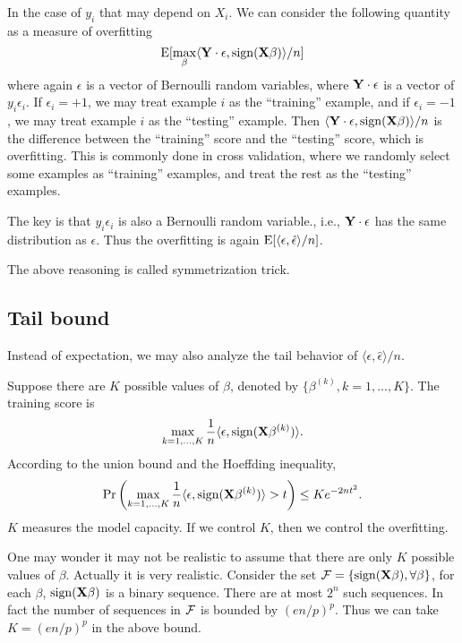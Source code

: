 \documentclass[11pt]{article}
\newcommand{\E}{\mathbb{E}}
\def\E{{\rm E}}
\def\X{{\bf X}}
\def\Y{{\bf Y}}
\begin{document}
In the case of $y_i$ that may depend on $X_i$.  We can consider the following quantity as a measure of overfitting 
\[
    \E[\max_\beta \langle \Y \cdot \epsilon, {\rm sign}(\X\beta)\rangle /n]
 \]
 where again $\epsilon$ is a vector of Bernoulli random variables, where $\Y \cdot \epsilon$ is a vector of $y_i \epsilon_i$.  If $\epsilon_i = +1$, we may treat example $i$ as the ``training'' example, and if $\epsilon_i = -1$, we may treat example $i$ as the ``testing'' example.  Then $ \langle \Y \cdot \epsilon, {\rm sign}(\X\beta)\rangle /n$ is the difference between the ``training'' score and the ``testing'' score, which is overfitting.  This is commonly done in cross validation, where we randomly select some examples as ``training'' examples, and treat the rest as the ``testing'' examples. 
 
 The key is that $y_i \epsilon_i$ is also a Bernoulli random variable., i.e., $\Y \cdot \epsilon$ has the same distribution as $\epsilon$.  Thus the overfitting is again $\E[\langle \epsilon, \hat{\epsilon}\rangle/n]$. 
 
 The above reasoning is called symmetrization trick. 

 
 \subsection{Tail bound} 
 
Instead of expectation, we may also analyze the tail behavior of   $\langle \epsilon, \hat{\epsilon}\rangle/n$. 


Suppose there are $K$ possible values of $\beta$, denoted by $\{\beta^{(k)}, k = 1, ..., K\}$. The training score is 
\[
    \max_{k = 1, ..., K} \frac{1}{n} \langle \epsilon, {\rm sign}(\X\beta^{(k)})\rangle.
\]
 According to the union bound and the Hoeffding inequality, 
\[
   \Pr\left(    \max_{k = 1, ..., K}\frac{1}{n}  \langle \epsilon, {\rm sign}(\X\beta^{(k)})\rangle > t\right) \leq K e^{-2n t^2}. 
 \]
 $K$ measures the model capacity. If we control $K$, then we control the overfitting. 
 
One may wonder it may not be realistic to assume that there are only $K$ possible values of $\beta$. Actually it is very realistic. Consider the set ${\cal F} = \{{\rm sign}(\X\beta), \forall \beta\}$, for each $\beta$,  ${\rm sign}(\X\beta)$ is a binary sequence. There are at most $2^n$ such sequences. In fact the number of sequences in ${\cal F}$ is bounded by $(e n/p)^p$. Thus we can take $K = (en/p)^p$ in the above bound. 
\end{document}
